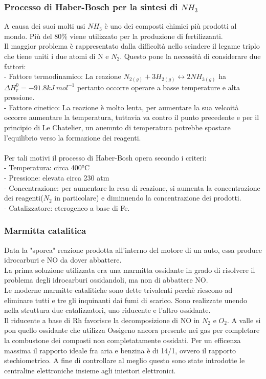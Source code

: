 \subsubsection{Processo di Haber-Bosch per la sintesi di $NH_3$}
A causa dei suoi molti usi $NH_3$ è uno dei composti chimici più prodotti al mondo. Più del 80\% viene utilizzato per la produzione di fertilizzanti.\\
Il maggior problema è rappresentato dalla difficoltà nello scindere il legame triplo che tiene uniti i due atomi di N e $N_2$. Questo pone la necessità di considerare due fattori:\\
\tab- Fattore termodinamico: La reazione $N_{2(g)} + 3H_{2(g)} \leftrightarrow 2NH_{3(g)}$ ha $\Delta H_r^0 = -91.8 kJ\ mol^{-1}$ pertanto occorre operare a basse temperature e alta pressione.\\
\tab- Fattore cinetico: La reazione è molto lenta, per aumentare la sua velcoità occorre aumentare la temperatura, tuttavia va contro il punto precedente e per il principio di Le Chatelier, un auemnto di temperatura potrebbe spostare l'equilibrio verso la formazione dei reagenti.\\\\
Per tali motivi il processo di Haber-Bosh opera secondo i criteri:\\
\tab- Temperatura: circa 400°C\\
\tab- Pressione: elevata circa 230 atm\\
\tab- Concentrazione: per aumentare la resa di reazione, si aumenta la concentrazione dei reagenti($N_2$ in particolare) e diminuendo la concentrazione dei prodotti.\\
\tab- Catalizzatore: eterogeneo a base di Fe.
\subsubsection{Marmitta catalitica}
Data la "sporca" reazione prodotta all'interno del motore di un auto, essa produce idrocarburi e NO da dover abbattere.\\
La prima soluzione utilizzata era una marmitta ossidante in grado di risolvere il problema degli idrocarburi ossidandoli, ma non di abbattere NO.\\
Le moderne marmitte catalitiche sono dette trivalenti perchè riescono ad eliminare tutti e tre gli inquinanti dai fumi di scarico. Sono realizzate unendo nella struttura due catalizzatori, uno riducente e l'altro ossidante.\\
Il riducente a base di Rh favorisce la decomposizione di NO in $N_2$ e $O_2$. A valle si pon quello ossidante che utilizza Ossigeno ancora presente nei gas per completare la combustone dei composti non completatamente ossidati.
Per un efficenza massima il rapporto ideale fra aria e benzina è di 14/1, ovvero il rapporto stechiometrico. A fine di controllare al meglio questo sono state introdotte le centraline elettroniche insieme agli iniettori elettronici.
